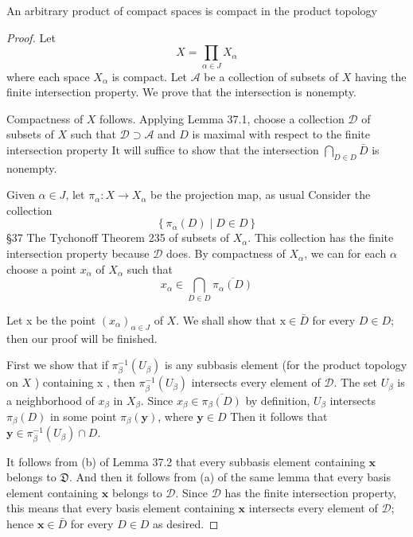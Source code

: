 \documentclass[12pt, a4paper, oneside]{book}
\begin{document}
\begin{theorem}
    An arbitrary product of compact spaces is compact in the product topology
    \begin{proof}
        Let
        \begin{equation*}
            X=\prod_{\alpha \in J} X_\alpha
        \end{equation*}
        where each space $X_\alpha$ is compact. Let $\mathcal{A}$ be a collection of subsets of $X$ having the finite intersection property. We prove that the intersection
        is nonempty.

        Compactness of $X$ follows.
        Applying Lemma 37.1, choose a collection $\mathcal{D}$ of subsets of $X$ such that $\mathcal{D} \supset \mathcal{A}$ and $D$ is maximal with respect to the finite intersection property It will suffice to show that the intersection $\bigcap_{D \in D} \bar{D}$ is nonempty.

        Given $\alpha \in J$, let $\pi_\alpha: X \rightarrow X_\alpha$ be the projection map, as usual Consider the collection
        \begin{equation*}
            \left\{\pi_\alpha(D) \mid D \in D\right\}
        \end{equation*}
        §37
        The Tychonoff Theorem
        235
        of subsets of $X_\alpha$. This collection has the finite intersection property because $\mathcal{D}$ does. By compactness of $X_\alpha$, we can for each $\alpha$ choose a point $x_\alpha$ of $X_\alpha$ such that
        \begin{equation*}
            x_\alpha \in \bigcap_{D \in D} \overline{\pi_\alpha(D)}
        \end{equation*}

        Let x be the point $\left(x_\alpha\right)_{\alpha \in J}$ of $X$. We shall show that $\mathrm{x} \in \bar{D}$ for every $D \in D$; then our proof will be finished.

        First we show that if $\pi_\beta^{-1}\left(U_\beta\right)$ is any subbasis element (for the product topology on $X$ ) containing x , then $\pi_\beta^{-1}\left(U_\beta\right)$ intersects every element of $\mathcal{D}$. The set $U_\beta$ is a neighborhood of $x_\beta$ in $X_\beta$. Since $x_\beta \in \overline{\pi_\beta(D)}$ by definition, $U_\beta$ intersects $\pi_\beta(D)$ in some point $\pi_\beta(\mathbf{y})$, where $\mathbf{y} \in D$ Then it follows that $\mathbf{y} \in \pi_\beta^{-1}\left(U_\beta\right) \cap D$.

        It follows from (b) of Lemma 37.2 that every subbasis element containing $\mathbf{x}$ belongs to $\mathfrak{D}$. And then it follows from (a) of the same lemma that every basis element containing $\mathbf{x}$ belongs to $\mathcal{D}$. Since $\mathcal{D}$ has the finite intersection property, this means that every basis element containing $\mathbf{x}$ intersects every element of $\mathcal{D}$; hence $\mathbf{x} \in \bar{D}$ for every $D \in D$ as desired.
    \end{proof}
\end{theorem}
\end{document}
